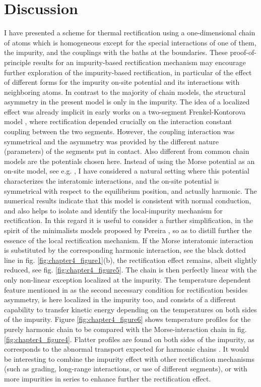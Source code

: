\section{Discussion\label{sec:chapter4_Discussion}}

I have presented  a scheme for thermal rectification using a one-dimensional chain of atoms which is homogeneous except
for the special interactions of one of them, the impurity, and the couplings with the baths at the boundaries. These proof-of-principle results for an impurity-based rectification mechanism may encourage further exploration of the impurity-based rectification, in particular of the effect of different forms for the impurity on-site potential and its interactions with neighboring atoms.
In contrast to the majority of chain models, the structural asymmetry in the present model is only in the impurity. The idea of a localized effect was already implicit in early works on a two-segment Frenkel-Kontorova
model \cite{Li2004,Hu2006}, where rectification depended crucially on the interaction constant coupling between the two segments.
However, the coupling interaction was symmetrical and the asymmetry was provided by the different nature
(parameters) of the segments put in contact.
Also different from common chain models are the potentials chosen here. Instead of using the Morse potential as an on-site model, see e.g.  \cite{Terraneo2002},
I have considered a natural setting where this potential characterizes the interatomic interactions,
and the on-site potential is symmetrical with respect to the equilibrium position, and actually harmonic.
The numerical results indicate that this model is consistent with normal conduction,
and also helps to isolate and identify the local-impurity mechanism for rectification.
In this regard it is useful to consider a further simplification, in the spirit of the minimalists models
proposed by Pereira \cite{Pereira2017}, so as to distill further the essence of the local rectification mechanism.
If the Morse interatomic interaction is substituted by the corresponding harmonic interaction, see the black dotted line in fig. \ref{fig:chapter4_figure1}(b), the rectification effect remains, albeit slightly reduced, see fig. \ref{fig:chapter4_figure5}. The chain is then perfectly linear with the only non-linear exception  localized
at the impurity.
The temperature dependent feature mentioned in \cite{Pereira2017} as the second necessary condition for rectification besides asymmetry, is here localized in the impurity too, and consists of a different
capability to transfer kinetic energy depending on the temperatures on both sides of the impurity.
Figure \ref{fig:chapter4_figure6} shows temperature profiles for the purely harmonic chain to be compared with the Morse-interaction
chain in fig. \ref{fig:chapter4_figure4}. Flatter profiles are found on both sides of the impurity, as corresponds to the abnormal transport expected for harmonic chains \cite{Lepri2003}. It would be interesting to combine the impurity effect with other rectification mechanisms (such as grading, long-range interactions, or use of different segments), or with more impurities in series to enhance further the rectification effect.

